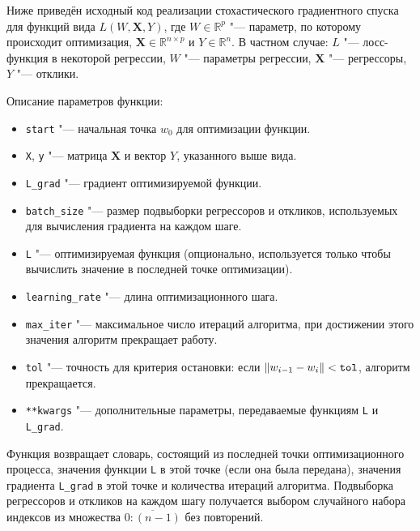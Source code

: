 \documentclass{article}
\begin{document}
Ниже приведён исходный код реализации стохастического градиентного спуска для
функций вида $L(W, \mathbf{X}, Y)$, где $W\in \mathbb{R}^p$ "--- параметр, по которому
происходит оптимизация, $\mathbf{X} \in \mathbb{R}^{n\times p}$ и $Y\in \mathbb{R}^{n}$.
В частном случае: $L$ "--- лосс-функция в некоторой регрессии, $W$ "--- параметры
регрессии, $\mathbf{X}$ "--- регрессоры, $Y$ "--- отклики.

\label{lst:SGD}
Описание параметров функции:
\begin{itemize}
  \item \verb|start| "--- начальная точка $w_0$ для оптимизации функции.
  \item \verb|X|, \verb|y| "--- матрица $\mathbf{X}$ и вектор $Y$, указанного выше вида.
  \item \verb|L_grad| "--- градиент оптимизируемой функции.
  \item \verb|batch_size| "--- размер подвыборки регрессоров и откликов,
    используемых для вычисления градиента на каждом шаге.
  \item \verb|L| "--- оптимизируемая функция (опционально, используется только чтобы
    вычислить значение в последней точке оптимизации).
  \item \verb|learning_rate| "--- длина оптимизационного шага.
  \item \verb|max_iter| "--- максимальное число итераций алгоритма,
    при достижении этого значения алгоритм прекращает работу.
  \item \verb|tol| "--- точность для критерия остановки: если
    $\|w_{i-1} - w_i\| < \verb|tol|$, алгоритм прекращается.
  \item \verb|**kwargs| "--- дополнительные параметры, передаваемые
    функциям \verb|L| и \verb|L_grad|.
\end{itemize}
Функция возвращает словарь, состоящий из последней точки оптимизационного процесса,
значения функции \verb|L| в этой точке (если она была передана), значения градиента
\verb|L_grad| в этой точке и количества итераций алгоритма.
Подвыборка регрессоров и откликов на каждом шагу получается выбором
случайного набора индексов из множества $\overline{0:(n-1)}$ без повторений.
\end{document}
